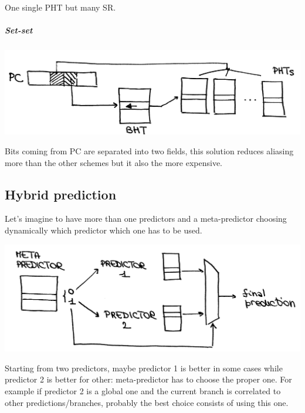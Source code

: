 One single PHT but many SR.

\subparagraph{Set-set}

\begin{center}
  \includegraphics[width=0.7\linewidth]{img/img3/23}
\end{center}

Bits coming from PC are separated into two fields, this solution reduces
aliasing more than the other schemes but it also the more expensive.


\subsection{Hybrid prediction}
Let's imagine to have more than one predictors and a meta-predictor choosing
dynamically which predictor which one has to be used.
\begin{center}
  \includegraphics[width=0.7\linewidth]{img/img3/24}
\end{center}

Starting from two predictors, maybe predictor 1 is better in some cases while
predictor 2 is better for other: meta-predictor has to choose the proper one.
For example if predictor 2 is a global one and the current branch is correlated
to other predictions/branches, probably the best choice consists of using this
one.


